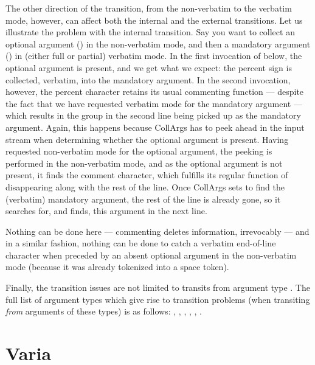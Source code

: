\documentclass[a4paper,11pt]{article}
\begin{document}
The other direction of the transition, from the non-verbatim to the verbatim
mode, however, can affect both the internal and the external transitions.  Let
us illustrate the problem with the internal transition.  Say you want to
collect an optional argument () in the non-verbatim mode, and
then a mandatory argument () in (either full or partial)
verbatim mode.  In the first invocation of  below, the
optional argument is present, and we get what we expect: the percent sign is
collected, verbatim, into the mandatory argument.  In the second invocation,
however, the percent character retains its usual commenting function ---
despite the fact that we have requested verbatim mode for the mandatory
argument --- which results in the group in the second line being picked up as
the mandatory argument.  Again, this happens because CollArgs has to peek ahead
in the input stream when determining whether the optional argument is present.
Having requested non-verbatim mode for the optional argument, the peeking is
performed in the non-verbatim mode, and as the optional argument is not
present, it finds the comment character, which fulfills its regular function of
disappearing along with the rest of the line.  Once CollArgs sets to find the
(verbatim) mandatory argument, the rest of the line is already gone, so it
searches for, and finds, this argument in the next line.

\long{}

Nothing can be done here --- commenting deletes information, irrevocably ---
and in a similar fashion, nothing can be done to catch a verbatim end-of-line
character when preceded by an absent optional argument in the non-verbatim mode
(because it was already tokenized into a space token).

Finally, the transition issues are not limited to transits from argument type
.  The full list of argument types which give rise to
transition problems (when transiting \emph{from} arguments of these types) is
as follows: , , ,
, , .


\endgroup %


\section{Varia}
\end{document}
